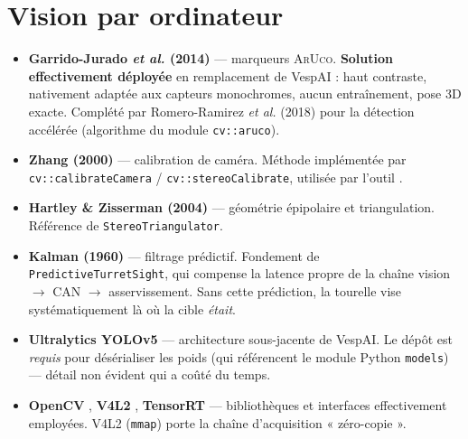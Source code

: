 \documentclass[11pt,a4paper]{article}
\begin{document}
\section{Vision par ordinateur}

\begin{itemize}[leftmargin=*]
  \item \textbf{Garrido-Jurado \emph{et al.} (2014)} \cite{garridojurado2014aruco} —
        marqueurs \textsc{ArUco}. \textbf{Solution effectivement déployée} en remplacement
        de VespAI : haut contraste, nativement adaptée aux capteurs monochromes, aucun
        entraînement, pose 3D exacte. Complété par
        Romero-Ramirez \emph{et al.} (2018) \cite{romeroramirez2018speeded} pour la
        détection accélérée (algorithme du module \texttt{cv::aruco}).

  \item \textbf{Zhang (2000)} \cite{zhang2000calibration} — calibration de caméra.
        Méthode implémentée par \texttt{cv::calibrateCamera} / \texttt{cv::stereoCalibrate},
        utilisée par l'outil .

  \item \textbf{Hartley \& Zisserman (2004)} \cite{hartley2004multiview} — géométrie
        épipolaire et triangulation. Référence de \texttt{StereoTriangulator}.

  \item \textbf{Kalman (1960)} \cite{kalman1960filter} — filtrage prédictif. Fondement de
        \texttt{PredictiveTurretSight}, qui compense la latence propre de la chaîne
        vision $\rightarrow$ CAN $\rightarrow$ asservissement. Sans cette prédiction, la
        tourelle vise systématiquement là où la cible \emph{était}.

  \item \textbf{Ultralytics YOLOv5} \cite{ultralytics2020yolov5} — architecture
        sous-jacente de VespAI. Le dépôt est \emph{requis} pour désérialiser les poids
         (qui référencent le module Python \texttt{models}) — détail non
        évident qui a coûté du temps.

  \item \textbf{OpenCV} \cite{opencv}, \textbf{V4L2} \cite{v4l2},
        \textbf{TensorRT} \cite{nvidia_tensorrt} — bibliothèques et interfaces
        effectivement employées. V4L2 (\texttt{mmap}) porte la chaîne d'acquisition
        « zéro-copie ».
\end{itemize}
\end{document}
